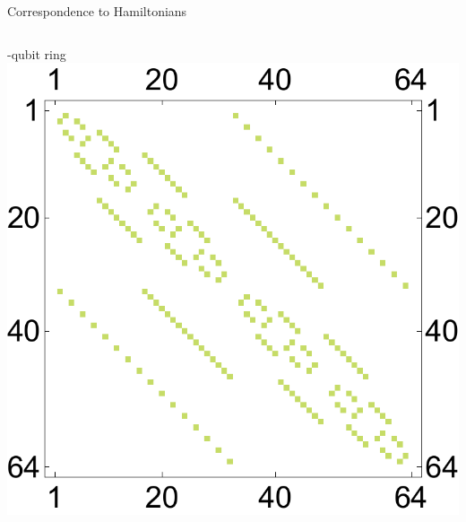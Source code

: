 \documentclass{beamer}
\begin{document}
\begin{frame}{Correspondence to Hamiltonians}
	\begin{columns}[T]
		\begin{column}{0.33\textwidth}
			-qubit ring
   			\includegraphics[width=\textwidth]{Images/ring6_hamilton}
		\end{column}
\end{columns}
\end{frame}
\end{document}
